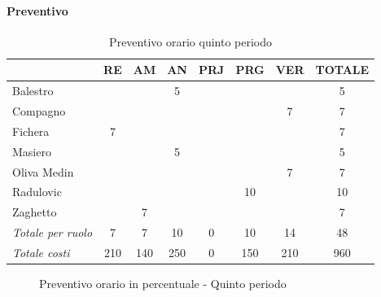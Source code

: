 \documentclass[a4paper,12pt]{article}
\begin{document}
            \paragraph{Preventivo}
                \begin{table}[H]
                \centering
                \caption{Preventivo orario quinto periodo}
                \begin{tabular}{|l|c|c|c|c|c|c|c|}
                \hline
                    \rowcolor{lightgray}{\textbf{Membro}} & {\textbf{RE}} & {\textbf{AM}} & {\textbf{AN}} & {\textbf{PRJ}} & {\textbf{PRG}} & {\textbf{VER}} & {\textbf{TOTALE}}\\
                \hline
                    Balestro & & & 5 & & & & 5\\
                \hline
                    Compagno & & & & & & 7 & 7\\
                \hline
                    Fichera & 7 & & & & & & 7\\
                \hline
                    Masiero & & & 5 & & & & 5\\
                \hline
                    Oliva Medin & & & & & & 7 & 7\\
                \hline
                    Radulovic & & & & & 10 & & 10\\
                \hline
                    Zaghetto & & 7 & & & & & 7\\
                \hline
                    \rowcolor{lightgray}\textit{Totale per ruolo} & 7 & 7 & 10 & 0 & 10 & 14 & 48\\
                \hline
                    \rowcolor{lightgray}\textit{Totale costi} & 210 & 140 & 250 & 0 & 150 & 210 & 960\\
                \hline
                \end{tabular}
                \end{table}

                \begin{figure}[H]
                \centering
                \caption{Preventivo orario in percentuale - Quinto periodo}
                \end{figure}
                
\end{document}
